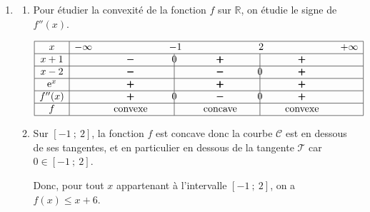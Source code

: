 \documentclass[10pt]{article}
\providecommand{\e}{{\mathrm{e}}}
\begin{document}
\begin{enumerate}[resume]
\item 
	\begin{enumerate}
		\item Pour étudier la convexité de la fonction $f$ sur $\mathbb{R}$, on étudie le signe de $f''(x)$.
		
\begin{center}
{
\renewcommand{\arraystretch}{1.5}
\def\esp{\hspace*{2cm}}
$\begin{array}{|c | *{7}{c} |} 
\hline
x  & -\infty & \esp & -1 & \esp & 2 & \esp & +\infty \\
\hline
x+1 &  & \pmb{-} &  \vline\hspace{-2.7pt}{0} & \pmb{+} & \vline\hspace{-2.7pt}{\phantom 0} & \pmb{+} &\\
\hline
x-2 &  & \pmb{-} &  \vline\hspace{-2.7pt}{\phantom 0} & \pmb{-} & \vline\hspace{-2.7pt}{0} & \pmb{+} &\\
\hline
\e^x &  & \pmb{+} &  \vline\hspace{-2.7pt}{\phantom 0} & \pmb{+} & \vline\hspace{-2.7pt}{\phantom 0} & \pmb{+} &\\
\hline
f''(x) &  & \pmb{+} &  \vline\hspace{-2.7pt}{0} & \pmb{-} & \vline\hspace{-2.7pt}{0} & \pmb{+} & \\
\hline
f &  & \text{convexe} &  \vline\hspace{-2.7pt}{\phantom 0} & \text{concave} & \vline\hspace{-2.7pt}{\phantom 0} & \text{convexe} & \\
\hline
\end{array}$
}
\end{center}
		
		\item 
Sur $[-1~;~2]$, la fonction $f$ est concave donc la courbe $\mathcal{C}$ est en dessous de ses tangentes, et en particulier en dessous de la tangente $\mathcal{T}$ car $0\in [-1~;~2]$.		
		
Donc, pour tout $x$ appartenant à l'intervalle $[-1~;~2]$, on a $f(x) \leqslant x + 6$.		
	\end{enumerate}
\end{enumerate}

\bigskip
\end{document}
